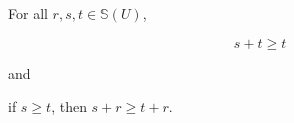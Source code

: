 For all $r, s, t \in \mathbb{S}(U)$,

$$s + t \geq t$$

and

if $s \geq t$, then $s + r \geq t + r$.
